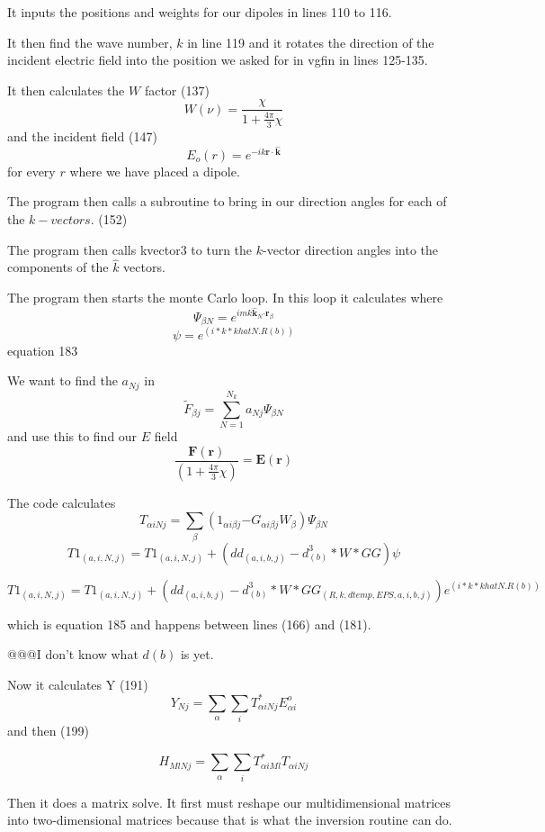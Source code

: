 \documentclass{article}
\begin{document}
It inputs the positions and weights for our dipoles in lines 110 to 116.

It then find the wave number, $k$ in line 119 and it rotates the direction
of the incident electric field into the position we asked for in vgfin in
lines 125-135.

It then calculates the $W$ factor (137) 
\[
W\left( \nu \right) =\frac{\chi }{1+\frac{4\pi }{3}\chi }
\]%
and the incident field (147) 
\[
E_{o}\left( r\right) =e^{-ik\mathbf{r}\cdot \mathbf{\hat{k}}}
\]%
for every $r$ where we have placed a dipole.

The program then calls a subroutine to bring in our direction angles for
each of the $k-vectors.$ (152)

The program then calls kvector3 to turn the $k$-vector direction angles into
the components of the $\hat{k}$ vectors.

The program then starts the monte Carlo loop. In this loop it calculates
where 
\begin{equation}
\Psi _{\beta N}=e^{imk\mathbf{\hat{k}}_{N}\mathbf{\cdot r}_{\beta }}
\label{PSYFUN}
\end{equation}%
\[
\psi =e^{(i\ast k\ast khatN.R(b))}
\]%
equation 183

We want to find the $a_{Nj}$ in 
\begin{equation}
\tilde{F}_{\beta j}\mathbf{=}\sum_{N=1}^{N_{k}}a_{Nj}\Psi _{\beta N}
\end{equation}%
and use this to find our $E$ field%
\[
\frac{\mathbf{F}(\mathbf{r})}{(1+\frac{4\pi }{3}\chi )}=\mathbf{E}(\mathbf{r}%
) 
\]

The code calculates 
\[
T_{\alpha iNj}=\sum_{\beta }\left( 1_{\alpha i\beta j}\mathbf{-}G_{\alpha
i\beta j}W_{\beta }\right) \Psi _{\beta N}
\]%
\[
T1_{(a,i,N,j)}=T1_{(a,i,N,j)}+(dd_{(a,i,b,j)}-d_{(b)}^{3}\ast W\ast GG)\psi 
\]

\[
T1_{(a,i,N,j)}=T1_{(a,i,N,j)}+(dd_{(a,i,b,j)}-d_{(b)}^{3}\ast W\ast
GG_{(R,k,dtemp,EPS,a,i,b,j)})e^{(i\ast k\ast khatN.R(b))} 
\]

which is equation 185 and happens between lines (166) and (181).

@@@I don't know what $d\left( b\right) $ is yet.

Now it calculates Y (191)%
\[
Y_{Nj}=\sum_{\alpha }\sum_{i}T_{\alpha iNj}^{\ast }E_{\alpha i}^{o} 
\]%
and then (199)

\[
H_{MlNj}=\sum_{\alpha }\sum_{i}T_{\alpha iMl}^{\ast }T_{\alpha iNj} 
\]

Then it does a matrix solve. It first must reshape our multidimensional
matrices into two-dimensional matrices because that is what the inversion
routine can do.
\end{document}
